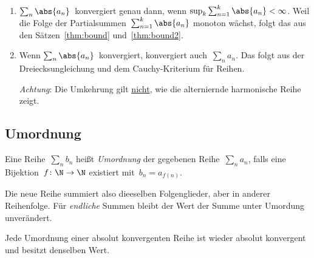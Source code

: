 \documentclass[a4paper]{article}
\begin{document}
\begin{remark}\leavevmode
    \begin{enumerate}
        \item $\sum_n \abs{a_n}$~konvergiert genau dann, wenn $\sup_{k} \sum_{n=1}^k \abs{a_n} < \infty$. Weil die Folge der Partialsummen~$\sum_{n=1}^k \abs{a_n}$ monoton wächst, folgt das aus den Sätzen~\ref{thm:bound} und~\ref{thm:bound2}.
        \item Wenn $\sum_n \abs{a_n}$~konvergiert, konvergiert auch~$\sum_n a_n$. Das folgt aus der Dreiecksungleichung und dem Cauchy-Kriterium für Reihen.

              \emph{Achtung}: Die Umkehrung gilt \underline{nicht}, wie die alterniernde harmonische Reihe zeigt.
    \end{enumerate}
\end{remark}

\subsection{Umordnung}

\begin{definition}[Umordnung]
    Eine Reihe~$\sum_n b_n$ heißt \emph{Umordnung} der gegebenen Reihe~$\sum_n a_n$, falls eine Bijektion~$f\colon \N\to\N$ existiert mit~$b_n = a_{f(n)}$.
\end{definition}

Die neue Reihe summiert also dieeselben Folgenglieder, aber in anderer Reihenfolge. Für \emph{endliche} Summen bleibt der Wert der Summe unter Umordung unverändert.

\begin{theorem}[Umordnungssatz]\label{thm:series:rearrangement}
    Jede Umordnung einer absolut konvergenten Reihe ist wieder absolut konvergent und besitzt denselben Wert.
\end{theorem}
\end{document}
